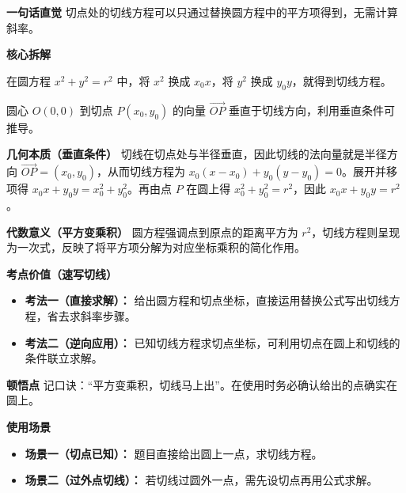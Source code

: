\begin{explanationbox}
	\textbf{\textcolor{CExplanation}{一句话直觉}}
	切点处的切线方程可以只通过替换圆方程中的平方项得到，无需计算斜率。

	\medskip
	\textbf{\textcolor{CExplanation}{核心拆解}}
	\begin{description}[style=nextline, leftmargin=2.8em, labelsep=0.5em, itemsep=0.45em]
		\item[\textbf{要点一（替换法则）：}]
			在圆方程 $x^2+y^2=r^2$ 中，将 $x^2$ 换成 $x_0 x$，将 $y^2$ 换成 $y_0 y$，就得到切线方程。
		\item[\textbf{要点二（几何基础）：}]
			圆心 $O(0,0)$ 到切点 $P(x_0,y_0)$ 的向量 $\vec{OP}$ 垂直于切线方向，利用垂直条件可推导。
	\end{description}

	\medskip
	\textbf{\textcolor{CExplanation}{几何本质（垂直条件）}}
	切线在切点处与半径垂直，因此切线的法向量就是半径方向 $\vec{OP}=(x_0,y_0)$，从而切线方程为 $x_0(x-x_0)+y_0(y-y_0)=0$。展开并移项得 $x_0 x+y_0 y = x_0^2+y_0^2$。再由点 $P$ 在圆上得 $x_0^2+y_0^2=r^2$，因此 $x_0 x+y_0 y = r^2$。

	\medskip
	\textbf{\textcolor{CExplanation}{代数意义（平方变乘积）}}
	圆方程强调点到原点的距离平方为 $r^2$，切线方程则呈现为一次式，反映了将平方项分解为对应坐标乘积的简化作用。

	\medskip
	\textbf{\textcolor{CExplanation}{考点价值（速写切线）}}
	\begin{itemize}[leftmargin=*, itemsep=0.5em, topsep=0.4em]
		\item \textbf{考法一（直接求解）：} 给出圆方程和切点坐标，直接运用替换公式写出切线方程，省去求斜率步骤。
		\item \textbf{考法二（逆向应用）：} 已知切线方程求切点坐标，可利用切点在圆上和切线的条件联立求解。
	\end{itemize}

	\medskip
	\textbf{\textcolor{CExplanation}{顿悟点}}
	记口诀：“平方变乘积，切线马上出”。在使用时务必确认给出的点确实在圆上。

	\medskip
	\textbf{\textcolor{CExplanation}{使用场景}}
	\begin{itemize}[leftmargin=*, itemsep=0.5em, topsep=0.4em]
		\item \textbf{场景一（切点已知）：} 题目直接给出圆上一点，求切线方程。
		\item \textbf{场景二（过外点切线）：} 若切线过圆外一点，需先设切点再用公式求解。
	\end{itemize}

\end{explanationbox}
